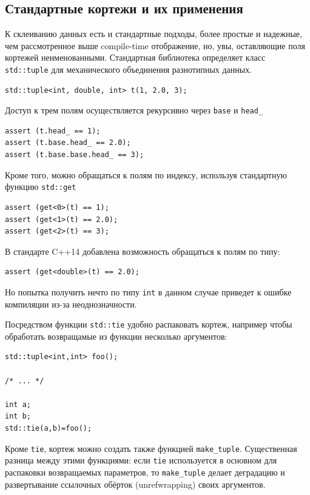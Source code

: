 \documentclass[a4paper,12pt,oneside]{book}
\begin{document}
\subsection{Стандартные кортежи и их применения}\label{StdTuples}

К склеиванию данных есть и стандартные подходы, более простые и надежные, чем рассмотренное выше compile-time отображение, но, увы, оставляющие поля кортежей неименованными. Стандартная библиотека определяет класс \lstinline!std::tuple! для механического объединения разнотипных данных.

\begin{lstlisting}
std::tuple<int, double, int> t(1, 2.0, 3);
\end{lstlisting}

Доступ к трем полям осуществляется рекурсивно через \lstinline!base! и \lstinline!head_!

\begin{lstlisting}
assert (t.head_ == 1);
assert (t.base.head_ == 2.0);
assert (t.base.base.head_ == 3);
\end{lstlisting}

Кроме того, можно обращаться к полям по индексу, используя стандартную функцию \lstinline!std::get!

\begin{lstlisting}
assert (get<0>(t) == 1);
assert (get<1>(t) == 2.0);
assert (get<2>(t) == 3);
\end{lstlisting}

В стандарте C++14 добавлена возможность обращаться к полям по типу:

\begin{lstlisting}
assert (get<double>(t) == 2.0);
\end{lstlisting}

Но попытка получить нечто по типу \lstinline!int! в данном случае приведет к ошибке компиляции из-за неоднозначности.

Посредством функции \lstinline!std::tie! удобно распаковать кортеж, например чтобы обработать возвращамые из функции несколько аргументов:

\begin{lstlisting}
std::tuple<int,int> foo();

/* ... */

int a;
int b;
std::tie(a,b)=foo();
\end{lstlisting}

Кроме \lstinline!tie!, кортеж можно создать также функцией \lstinline!make_tuple!. Существенная разница между этими функциями: если \lstinline!tie! используется в основном для распаковки возвращаемых параметров, то \lstinline!make_tuple! делает деградацию и развертывание ссылочных обёрток (unrefwrapping) своих аргументов.
\end{document}
